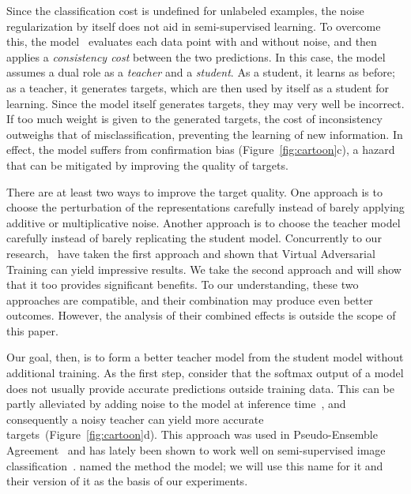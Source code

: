\documentclass{article}
\begin{document}
Since the classification cost is undefined for unlabeled examples, the noise regularization by itself does not aid in semi-supervised learning.
To overcome this, the  model~\citep{rasmus_semi-supervised_2015} evaluates each data point with and without noise, and then applies a \textit{consistency cost} between the two predictions.
In this case, the model assumes a dual role as a \textit{teacher} and a \textit{student}.
As a student, it learns as before; as a teacher, it generates targets, which are then used by itself as a student for learning.
Since the model itself generates targets, they may very well be incorrect.
If too much weight is given to the generated targets, the cost of inconsistency outweighs that of misclassification, preventing the learning of new information.
In effect, the model suffers from confirmation bias (Figure~\ref{fig:cartoon}c), a hazard that can be mitigated by improving the quality of targets.

There are at least two ways to improve the target quality.
One approach is to choose the perturbation of the representations carefully instead of barely applying additive or multiplicative noise.
Another approach is to choose the teacher model carefully instead of barely replicating the student model.
Concurrently to our research,~\citet{miyato_virtual_2017} have taken the first approach and shown that Virtual Adversarial Training can yield impressive results.
We take the second approach and will show that it too provides significant benefits.
To our understanding, these two approaches are compatible, and their combination may produce even better outcomes.
However, the analysis of their combined effects is outside the scope of this paper.

Our goal, then, is to form a better teacher model from the student model without additional training.
As the first step, consider that the softmax output of a model does not usually provide accurate predictions outside training data.
This can be partly alleviated by adding noise to the model at inference time~\citep{gal_dropout_2016}, and consequently a noisy teacher can yield more accurate targets~(Figure~\ref{fig:cartoon}d).
This approach was used in Pseudo-Ensemble Agreement~\citep{bachman_learning_2014} and has lately been shown to work well on semi-supervised image classification~\citep{laine_temporal_2016, sajjadi_regularization_2016}.
\citet{laine_temporal_2016} named the method the  model; we will use this name for it and their version of it as the basis of our experiments.
\end{document}
